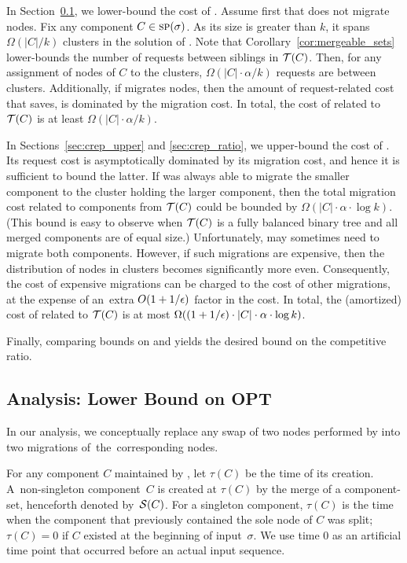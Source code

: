 In Section~\ref{sec:opt_lower}, we lower-bound the cost of \OPT. Assume first that \OPT
does not migrate nodes. Fix any component $C \in \textsc{sp}(\sigma)$. As its size is
greater than $k$, it spans $\Omega(|C|/k)$ clusters in the solution of \OPT. Note
that Corollary~\ref{cor:mergeable_sets} lower-bounds the number of requests between
siblings in $\mathcal{T}(C)$. Then, for any assignment of nodes of $C$ to 
the clusters, $\Omega(|C| \cdot \alpha /k)$ requests are between clusters.
Additionally, if \OPT migrates nodes, then the amount of
request-related cost that \OPT saves, is dominated by the migration cost. In total,
the cost of \OPT related to~$\mathcal{T}(C)$ is at least $\Omega(|C| \cdot
\alpha / k)$.

In Sections~\ref{sec:crep_upper} and \ref{sec:crep_ratio}, we upper-bound the cost of
\CREP. Its request cost is asymptotically dominated by its migration cost, and
hence it is sufficient to bound the latter. If \CREP was always able to migrate
the smaller component to the cluster holding the larger component, then the
total migration cost related to components from $\mathcal{T}(C)$ could be bounded by
$\Omega(|C| \cdot \alpha \cdot \log k)$. (This bound is easy to observe when
$\mathcal{T}(C)$ is a fully balanced binary tree and all merged components are of equal
size.) Unfortunately, \CREP may sometimes need to migrate both components. 
However, if such migrations are expensive, then the
distribution of nodes in clusters becomes significantly more even. Consequently, 
the cost of expensive migrations can be charged to the cost of other migrations,
at the expense of an~extra $O(1 + 1/\epsilon)$ factor in the cost.
In total, the (amortized) cost of \CREP related to $\mathcal{T}(C)$ is at most
$\Omega((1+1/\epsilon) \cdot |C| \cdot \alpha \cdot \log k)$.

Finally, comparing bounds on \CREP and \OPT yields the desired bound on the
competitive ratio.



\subsection{Analysis: Lower Bound on OPT}
\label{sec:opt_lower}

In our analysis, we conceptually
replace any swap of two nodes performed by \OPT into two migrations of~the~corresponding nodes.

For any component $C$ maintained by \CREP, let $\tau(C)$ be the time of its
creation. A~non-singleton component~$C$ is created at $\tau(C)$ by the merge
of a component-set, henceforth denoted by~$\mathcal{S}(C)$. For a singleton component,
$\tau(C)$ is the time when the component that previously contained the sole
node of $C$ was split; $\tau(C) = 0$ if $C$ existed at the beginning of
input~$\sigma$. We use time $0$ as an artificial time point that occurred
before an actual input sequence.

